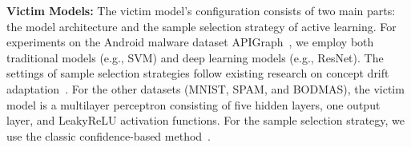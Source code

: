 \documentclass[lettersize,journal]{IEEEtran}
\begin{document}
\textbf{Victim Models:} 
The victim model’s configuration consists of two main parts: the model architecture and the sample selection strategy of active learning.
For experiments on the Android malware dataset APIGraph~\cite{2020-CCS-APIGraph}, we employ both traditional models (e.g., SVM) and deep learning models (e.g., ResNet).
The settings of sample selection strategies follow existing research on concept drift adaptation~\cite{2023-Usenix-chenyizhen,2022-SP-Trancending,2021-Usenix-CDAE,2023-survey-uncertainty-in-deep-neural-networks}.
For the other datasets (MNIST, SPAM, and BODMAS), the victim model is a multilayer perceptron consisting of five hidden layers, one output layer, and LeakyReLU activation functions.
For the sample selection strategy, we use the classic confidence-based method~\cite{2023-survey-uncertainty-in-deep-neural-networks}.
\end{document}
